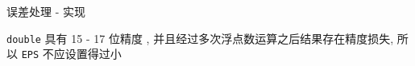 \begin{frame}[fragile]{误差处理 - 实现}
	\label{basic2d:ssec:eps}

	\verb|double| 具有 15 - 17 位精度 \cite{enwiki:1096894205}, 并且经过多次浮点数运算之后结果存在精度损失, 所以 \verb|EPS| 不应设置得过小

\end{frame}
